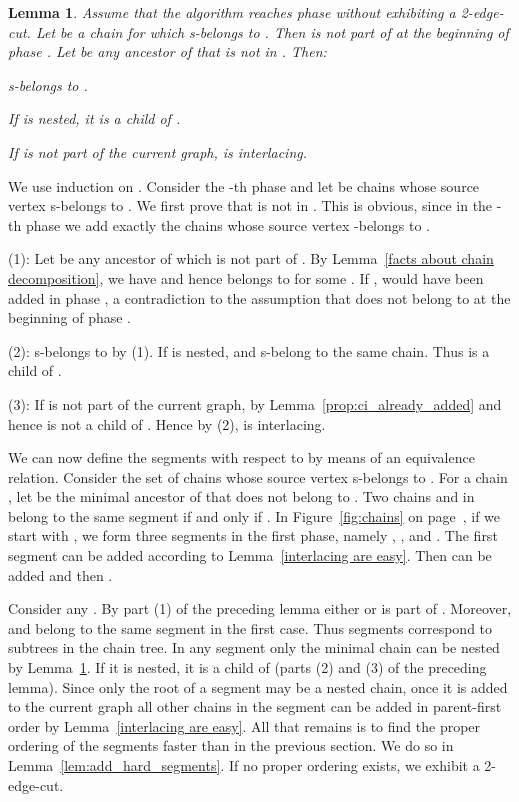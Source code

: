 \documentclass[paper=a4]{scrartcl}
\newtheorem{lemma}{Lemma}
\newcommand{\qed}{}
\newcommand{\mqed}{\hfill}
\newlength{\proofpostskipamount}\newlength{\proofpreskipamount}
\newenvironment{proof}{\par\vspace{\proofpreskipamount}\noindent{\textbf{Proof:}}\hspace{0.5em}}{\nopagebreak \strut\nopagebreak \hspace{\fill}\mqed\par\vspace{\proofpostskipamount}\noindent}
\begin{document}
\begin{lemma}\label{lem:no_type_one} Assume that the algorithm reaches phase  without exhibiting a 2-edge-cut. Let  be a chain for which  s-belongs to . Then  is not part of  at the beginning of phase . Let  be any ancestor of  that is not in . Then:
\begin{compactenum}[(1)]
\item  s-belongs to .
\item If  is nested, it is a child of .
\item If  is not part of the current graph,  is interlacing.
\end{compactenum}
\end{lemma}
\begin{proof}
We use induction on . Consider the -th phase and let  be chains whose source vertex  s-belongs to . We first prove that  is not in . This is obvious, since in the -th phase we add exactly the chains whose source vertex -belongs to .

(1): Let  be any ancestor of  which is not part of . By Lemma~\ref{facts about chain decomposition}, we have  and hence  belongs to  for some . If ,  would have been added in phase , a contradiction to the assumption that  does not belong to  at the beginning of phase .

(2):  s-belongs to  by (1). If  is nested,  and  s-belong to the same chain. Thus  is a child of .

(3): If  is not part of the current graph,  by Lemma~\ref{prop:ci_already_added} and hence  is not a child of . Hence by (2),  is interlacing.\qed
\end{proof}

We can now define the segments with respect to  by means of an equivalence relation. Consider the set  of chains whose source vertex s-belongs to . For a chain , let  be the minimal ancestor of  that does not belong to . Two chains  and  in  belong to the same segment if and only if . In Figure~\ref{fig:chains} on page~\pageref{fig:chains}, if we start with , we form three segments in the first phase, namely , , and . The first segment can be added according to Lemma~\ref{interlacing are easy}. Then  can be added and then .

Consider any . By part (1) of the preceding lemma either  or  is part of . Moreover,  and  belong to the same segment in the first case. Thus segments correspond to subtrees in the chain tree. In any segment only the minimal chain can be nested by Lemma~\ref{lem:no_type_one}. If it is nested, it is a child of  (parts (2) and (3) of the preceding lemma). Since only the root of a segment may be a nested chain, once it is added to the current graph all other chains in the segment can be added in parent-first order by Lemma~\ref{interlacing are easy}. All that remains is to find the proper ordering of the segments faster than in the previous section. We do so in Lemma~\ref{lem:add_hard_segments}. If no proper ordering exists, we exhibit a 2-edge-cut.
\end{document}

